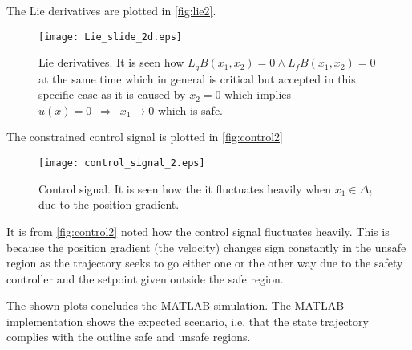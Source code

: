 The Lie derivatives are plotted in \autoref{fig:lie2}.
\begin{figure}[H]
	\center
		\texttt{[image: Lie\_slide\_2d.eps]}
	\caption{Lie derivatives. It is seen how $L_gB(x_1,x_2) = 0 \wedge L_fB(x_1,x_2) = 0$ at the same time which in general is critical but accepted in this specific case as it is caused by $x_2=0$ which implies $u(x)=0 \,\,\, \Rightarrow \,\,\, x_1 \rightarrow 0$ which is safe.}
	\label{fig:lie2}
\end{figure}
The constrained control signal is plotted in \autoref{fig:control2}
\begin{figure}[H]
	\center
		\texttt{[image: control\_signal\_2.eps]}
	\caption{Control signal. It is seen how the it fluctuates heavily when $x_1 \in \Delta_t$ due to the position gradient.}
	\label{fig:control2}
\end{figure}
It is from \autoref{fig:control2} noted how the control signal fluctuates heavily. This is because the position gradient (the velocity) changes sign constantly in the unsafe region as the trajectory seeks to go either one or the other way due to the safety controller and the setpoint given outside the safe region.

The shown plots concludes the MATLAB simulation. The MATLAB implementation shows the expected scenario, i.e. that the state trajectory complies with the outline safe and unsafe regions.
